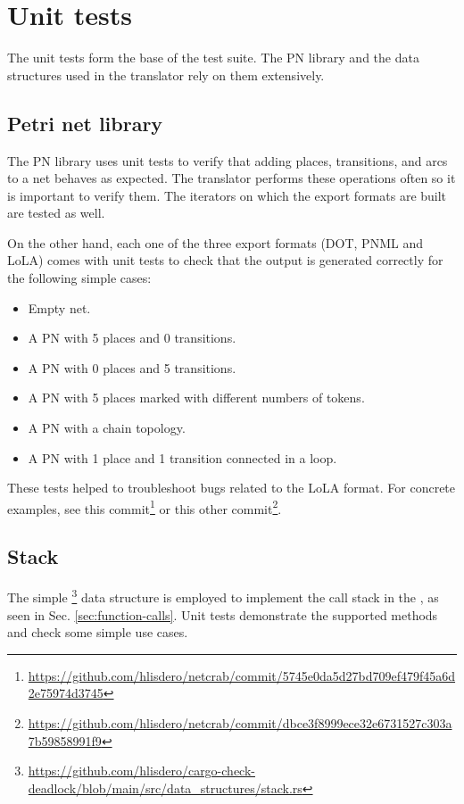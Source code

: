 \section{Unit tests}

The unit tests form the base of the test suite.
The \acrshort{PN} library and the data structures
used in the translator rely on them extensively.

\subsection{Petri net library}

The \acrshort{PN} library  uses unit tests to verify that
adding places, transitions, and arcs to a net behaves as expected.
The translator performs these operations often so it is important to verify them.
The iterators on which the export formats are built are tested as well.

On the other hand, each one of the three export formats
(DOT, \acrshort{PNML} and \acrshort{LoLA}) comes with unit tests
to check that the output is generated correctly for the following simple cases:

\begin{itemize}
  \item Empty net.
  \item A \acrshort{PN} with 5 places and 0 transitions.
  \item A \acrshort{PN} with 0 places and 5 transitions.
  \item A \acrshort{PN} with 5 places marked with different numbers of tokens.
  \item A \acrshort{PN} with a chain topology.
  \item A \acrshort{PN} with 1 place and 1 transition connected in a loop.
\end{itemize}

These tests helped to troubleshoot bugs related to the \acrshort{LoLA}
format.
For concrete examples,
see this commit\footnote{\url{https://github.com/hlisdero/netcrab/commit/5745e0da5d27bd709ef479f45a6d2e75974d3745}}
or this other commit\footnote{\url{https://github.com/hlisdero/netcrab/commit/dbce3f8999ece32e6731527c303a7b59858991f9}}.

\subsection{Stack}

The simple
\footnote{\url{https://github.com/hlisdero/cargo-check-deadlock/blob/main/src/data_structures/stack.rs}}
data structure is employed to implement the call stack in the ,
as seen in Sec. \ref{sec:function-calls}.
Unit tests demonstrate the supported methods and check some simple use cases.

